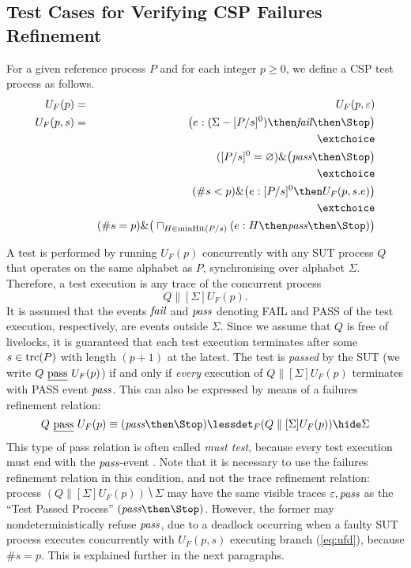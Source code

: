 \subsection{Test Cases for Verifying CSP Failures Refinement}

For a given reference process $P$ and for each integer $p\ge 0$, 
we define a CSP test process as follows. 
\begin{eqnarray}
U_F(p) & = & U_F(p,\varepsilon)
\\
U_F(p,s) & = & \big( e:(\Sigma - [P/s]^0) \then \efail\then \Stop \big)
\label{eq:ufa}
\\ & & \extchoice \nonumber
\\ & & ([P/s]^0 = \varnothing)    \&   \big( \epass \then \Stop \big)
\label{eq:ufb}
\\ & & \extchoice \nonumber
\\ & & (\#s < p) \& \big( e:[P/s]^0 \then U_F(p,s.e) \big)
\label{eq:ufc}
\\ & & \extchoice \nonumber
\\ & & (\#s = p) \& \big( \sqcap_{H\in\text{minHit}(P/s)} ( e:H \then \epass \then\Stop   )  \big)
\label{eq:ufd}
\end{eqnarray}

A test is performed by running $U_F(p)$ concurrently with any SUT process $Q$
that operates on the same alphabet as $P$, synchronising over
alphabet $\Sigma$. Therefore, a test execution is any trace of the concurrent process
\[
Q\parallel[\Sigma] U_F(p).
\]
It is assumed that the events ${\text{\it fail}}$ and ${\text{\it pass}}$ denoting FAIL and PASS of the test execution, respectively, are events outside $\Sigma$.
Since we assume that $Q$ is free of livelocks, it is guaranteed that each test execution terminates after some $s\in\text{trc}(P)$ with length $(p+1)$ at the latest. 
The test is \emph{passed} by the SUT (we write $Q\ \underline{\text{pass}}\ U_F(p)$) if and only if {\it every} execution of $Q\parallel[\Sigma] U_F(p)$ terminates with PASS event ${\text{\it pass}}$. This can also be  expressed by means of a failures refinement relation:
\[
Q\ \pass\ U_F(p) \equiv (\epass\then\Stop) \lessdet_F (Q\parallel[\Sigma] U_F(p)) \hide \Sigma  
\]
This type of pass relation is often called \emph{must test}, because every test execution must end with the ${\text{\it pass}}$-event \cite{Hennessy:1988:ATP:50497}. Note that it
is necessary to use the failures refinement relation in this condition, and not the trace refinement relation: process $(Q\parallel[\Sigma] U_F(p)) \hide \Sigma$ may have  the same visible traces $\varepsilon, {\text{\it pass}}$ as the ``Test Passed Process'' $(\epass\then\Stop)$. However,
the former may nondeterministically refuse ${\text{\it pass}}$, due to a deadlock occurring when
a faulty SUT process executes concurrently with $U_F(p,s)$ executing branch (\ref{eq:ufd}),
because $\#s = p$. This is explained further in the next paragraphs.


